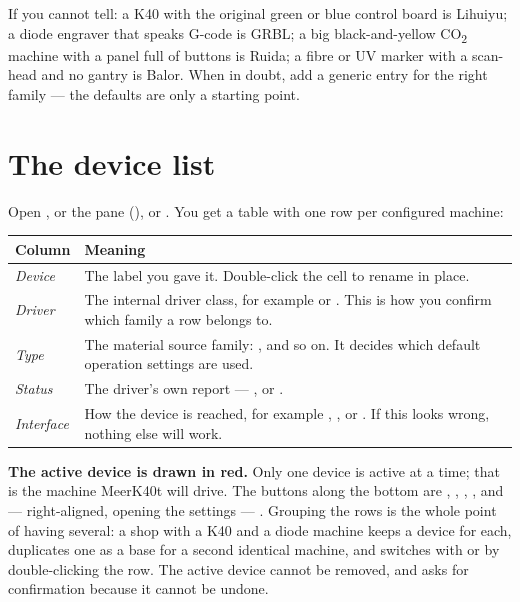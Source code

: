 \noindent If you cannot tell: a K40 with the original green or blue control board
is Lihuiyu; a diode engraver that speaks G-code is GRBL; a big
black-and-yellow CO\textsubscript{2} machine with a panel full of buttons is
Ruida; a fibre or UV marker with a scan-head and no gantry is Balor. When in
doubt, add a generic entry for the right family --- the defaults are only a
starting point.

\section{The device list}

Open , or the  pane
(), or . You get a table with one row per
configured machine:

\begin{center}\small
\begin{tabular}{@{}L{2.2cm}L{12.1cm}@{}}
\toprule
\textbf{Column} & \textbf{Meaning} \\
\midrule
\emph{Device} & The label you gave it. Double-click the cell to rename in
place. \\
\emph{Driver} & The internal driver class, for example  or
. This is how you confirm which family a row belongs to. \\
\emph{Type} & The material source family: ,  and so on. It
decides which default operation settings are used. \\
\emph{Status} & The driver's own report --- ,  or
. \\
\emph{Interface} & How the device is reached, for example ,
,  or . If this looks wrong, nothing
else will work. \\
\bottomrule
\end{tabular}
\end{center}

\noindent \textbf{The active device is drawn in red.} Only one device is active
at a time; that is the machine MeerK40t will drive. The buttons along the bottom
are , , , ,
 and --- right-aligned, opening the settings --- .
Grouping the rows is the whole point of having several: a shop with a K40 and a
diode machine keeps a device for each, duplicates one as a base for a second
identical machine, and switches with  or by double-clicking the
row. The active device cannot be removed, and  asks for confirmation
because it cannot be undone.

